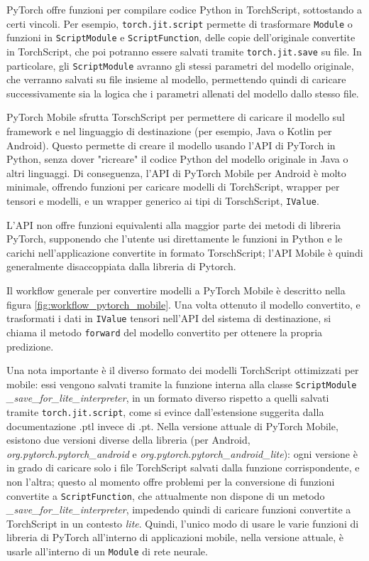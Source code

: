 PyTorch offre funzioni per compilare codice Python in TorchScript, sottostando a certi
vincoli. Per esempio, \texttt{torch.jit.script} permette di trasformare \texttt{Module}
o funzioni in \texttt{ScriptModule} e \texttt{ScriptFunction}, delle copie dell'originale
convertite in TorchScript, che poi potranno essere salvati tramite \texttt{torch.jit.save}
su file. In particolare, gli \texttt{ScriptModule} avranno gli stessi parametri del modello
originale, che verranno salvati su file insieme al modello, permettendo quindi di caricare
successivamente sia la logica che i parametri allenati del modello dallo stesso file.

PyTorch Mobile sfrutta TorschScript per permettere di caricare il modello sul framework 
e nel linguaggio di destinazione (per esempio, Java o Kotlin per Android). Questo permette
di creare il modello usando l'API di PyTorch in Python, senza dover "ricreare" il codice
Python del modello originale in Java o altri linguaggi. Di conseguenza, l'API di PyTorch 
Mobile per Android è molto minimale, offrendo funzioni per caricare modelli di TorchScript, 
wrapper per tensori e modelli, e un wrapper generico ai tipi di TorschScript, \texttt{IValue}.

L'API non offre funzioni equivalenti alla maggior parte dei metodi di libreria PyTorch, 
supponendo che l'utente usi direttamente le funzioni in Python e le carichi nell'applicazione
convertite in formato TorschScript; l'API Mobile è quindi generalmente disaccoppiata dalla
libreria di Pytorch.

Il workflow generale per convertire modelli a PyTorch Mobile è descritto nella figura 
\ref{fig:workflow_pytorch_mobile}. Una volta ottenuto il modello convertito, e trasformati
i dati in \texttt{IValue} tensori nell'API del sistema di destinazione, si chiama il metodo
\texttt{forward} del modello convertito per ottenere la propria predizione.

Una nota importante è il diverso formato dei modelli TorchScript ottimizzati per mobile: 
essi vengono salvati tramite la funzione interna alla classe \texttt{ScriptModule}
\emph{\_save\_for\_lite\_interpreter}, in un formato diverso rispetto a quelli salvati tramite
\texttt{torch.jit.script}, come si evince dall'estensione suggerita dalla documentazione .ptl
invece di .pt. Nella versione attuale di PyTorch Mobile, esistono due versioni diverse della
libreria (per Android, \emph{org.pytorch.pytorch\_android} e 
\emph{org.pytorch.pytorch\_android\_lite}): ogni versione è in grado di caricare solo i file
TorchScript salvati dalla funzione corrispondente, e non l'altra; questo al momento offre
problemi per la conversione di funzioni convertite a \texttt{ScriptFunction}, che attualmente
non dispone di un metodo \emph{\_save\_for\_lite\_interpreter}, impedendo quindi di caricare 
funzioni convertite a TorchScript in un contesto \emph{lite}. Quindi, l'unico modo di usare
le varie funzioni di libreria di PyTorch all'interno di applicazioni mobile, nella versione 
attuale, è usarle all'interno di un \texttt{Module} di rete neurale.

